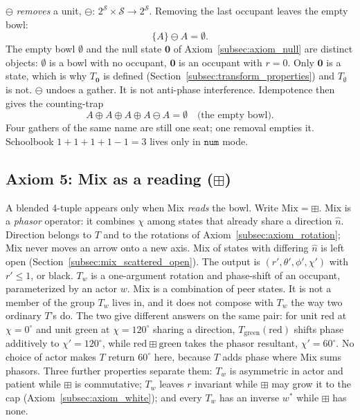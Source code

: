 \documentclass[12pt, a4paper]{article}
\begin{document}
$\ominus$ \emph{removes} a unit,
$\ominus:\,2^{\mathcal{S}}\times\mathcal{S}\to 2^{\mathcal{S}}$.
Removing the last occupant leaves the empty bowl:
\begin{equation}
    \{A\}\ominus A = \emptyset.
    \label{eq:ominus_empty}
\end{equation}
The empty bowl $\emptyset$ and the null state $\mathbf{0}$ of
Axiom~\ref{subsec:axiom_null} are distinct objects: $\emptyset$ is a
bowl with no occupant, $\mathbf{0}$ is an occupant with $r=0$. Only
$\mathbf{0}$ is a state, which is why $T_{\mathbf{0}}$ is defined
(Section~\ref{subsec:transform_properties}) and $T_{\emptyset}$ is
not.
$\ominus$ undoes a gather. It is not anti-phase interference.
Idempotence then gives the counting-trap
\begin{equation}
    A \oplus A \oplus A \oplus A \ominus A = \emptyset
    \quad\text{(the empty bowl)}.
    \label{eq:four_a_ominus}
\end{equation}
Four gathers of the same name are still one seat; one removal empties
it. Schoolbook $1+1+1+1-1=3$ lives only in $\mathtt{num}$ mode.

\subsection{Axiom 5: Mix as a reading (\texorpdfstring{$\boxplus$}{boxplus})}
\label{subsec:axiom_interference}
A blended 4-tuple appears only when Mix \emph{reads} the bowl.
Write $\mathrm{Mix}=\boxplus$. Mix is a \emph{phasor} operator: it
combines $\chi$ among states that already share a direction $\hat n$.
Direction belongs to $T$ and to the rotations of
Axiom~\ref{subsec:axiom_rotation}; Mix never moves an arrow onto a new
axis. Mix of states with differing $\hat n$ is left open
(Section~\ref{subsec:mix_scattered_open}). The output is
$(r',\theta',\phi',\chi')$ with $r'\le 1$, or black.
$T_w$ is a one-argument rotation and phase-shift of an occupant,
parameterized by an actor $w$. Mix is a combination of
peer states. It is not a member of the group $T_w$ lives in, and it
does not compose with $T_w$ the way two ordinary $T$'s do. The two
give different answers on the same pair: for unit red at $\chi=0^\circ$
and unit green at $\chi=120^\circ$ sharing a direction,
$T_{\mathrm{green}}(\mathrm{red})$ shifts phase additively to
$\chi'=120^\circ$, while $\mathrm{red}\boxplus\mathrm{green}$ takes the
phasor resultant, $\chi'=60^\circ$. No choice of actor makes $T$
return $60^\circ$ here, because $T$ adds phase where Mix sums phasors.
Three further properties separate them: $T_w$ is asymmetric in actor
and patient while $\boxplus$ is commutative; $T_w$ leaves $r$ invariant
while $\boxplus$ may grow it to the cap
(Axiom~\ref{subsec:axiom_white}); and every $T_w$ has an inverse
$w^{*}$ while $\boxplus$ has none.
\end{document}

